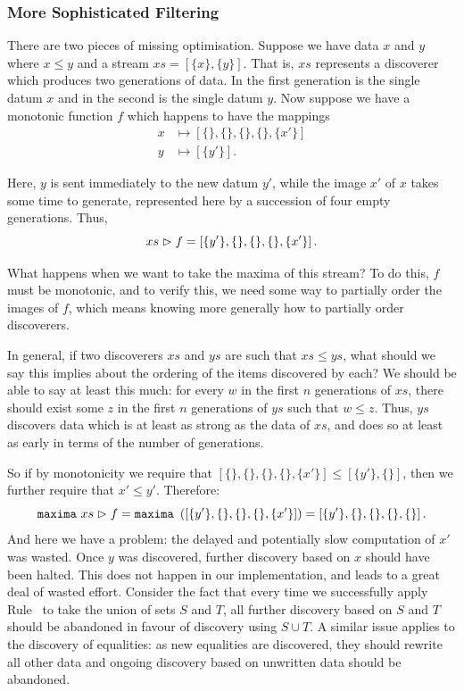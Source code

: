 \subsubsection{More Sophisticated Filtering}
There are two pieces of missing optimisation. Suppose we have data $x$ and $y$ where $x \leq y$ and a stream $xs = \left[\{x\}, \{y\}\right].$ That is, $xs$ represents a discoverer which produces two generations of data. In the first generation is the single datum $x$ and in the second is the single datum $y$. Now suppose we have a monotonic function $f$ which happens to have the mappings
\begin{align*}
x &\mapsto \left[\{\},\{\},\{\},\{\},\{x'\}\right]\\
y &\mapsto \left[\{y'\}\right].
\end{align*}

Here, $y$ is sent immediately to the new datum $y'$, while the image $x'$ of $x$ takes some time to generate, represented here by a succession of four empty generations. Thus,
\begin{displaymath}
xs \vartriangleright f = \left[\{y'\}, \{\}, \{\}, \{\}, \{x'\}\right].
\end{displaymath}

What happens when we want to take the maxima of this stream? To do this, $f$ must be monotonic, and to verify this, we need some way to partially order the images of $f$, which means knowing more generally how to partially order discoverers.

In general, if two discoverers $xs$ and $ys$ are such that $xs \leq ys$, what should we say this implies about the ordering of the items discovered by each? We should be able to say at least this much: for every $w$ in the first $n$ generations of $xs$, there should exist some $z$ in the first $n$ generations of $ys$ such that $w \leq z$. Thus, $ys$ discovers data which is at least as strong as the data of $xs$, and does so at least as early in terms of the number of generations.

So if by monotonicity we require that $\left[\{\},\{\},\{\},\{\},\{x'\}\right] \leq \left[\{y'\},\{\}\right]$, then we further require that $x' \leq y'$. Therefore:
\begin{displaymath}
\texttt{maxima}\ xs \vartriangleright f = \texttt{maxima}\ \left(\left[\{y'\}, \{\}, \{\}, \{\}, \{x'\}\right]\right) = \left[\{y'\}, \{\}, \{\}, \{\}, \{\}\right].
\end{displaymath}
And here we have a problem: the delayed and potentially slow computation of $x'$ was wasted. Once $y$ was discovered, further discovery based on $x$ should have been halted. This does not happen in our implementation, and leads to a great deal of wasted effort. Consider the fact that every time we successfully apply Rule~ to take the union of sets $S$ and $T$, all further discovery based on $S$ and $T$ should be abandoned in favour of discovery using $S \cup T$. A similar issue applies to the discovery of equalities: as new equalities are discovered, they should rewrite all other data and ongoing discovery based on unwritten data should be abandoned.

